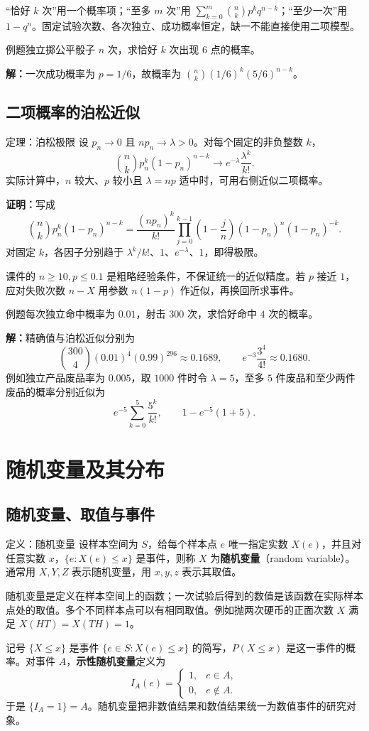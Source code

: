 \documentclass[UTF8,fontset=none,zihao=-4,a4paper]{ctexart}
\newcommand{\term}[1]{\textbf{#1}}
\newcommand{\example}[1]{\begin{infobox}{例题}#1\end{infobox}}
\newcommand{\solution}{\par\noindent\textbf{解：}}
\newcommand{\proof}{\par\noindent\textbf{证明：}}
\newcommand{\chapterpage}[1]{\clearpage\section{#1}}
\newcommand{\com}[2]{\binom{#1}{#2}}
\begin{document}
“恰好 $k$ 次”用一个概率项；“至多 $m$ 次”用 $\sum_{k=0}^m\com nk p^kq^{n-k}$；“至少一次”用 $1-q^n$。固定试验次数、各次独立、成功概率恒定，缺一不能直接使用二项模型。
\example{独立掷公平骰子 $n$ 次，求恰好 $k$ 次出现 $6$ 点的概率。}
\solution 一次成功概率为 $p=1/6$，故概率为 $\com nk(1/6)^k(5/6)^{n-k}$。
\subsection{二项概率的泊松近似}
\begin{infobox}{定理：泊松极限}
设 $p_n\to0$ 且 $np_n\to\lambda>0$。对每个固定的非负整数 $k$，
\[
\com nk p_n^k(1-p_n)^{n-k}\longrightarrow e^{-\lambda}\frac{\lambda^k}{k!}.
\]
实际计算中，$n$ 较大、$p$ 较小且 $\lambda=np$ 适中时，可用右侧近似二项概率。
\end{infobox}
\proof 写成
\[
\com nk p_n^k(1-p_n)^{n-k}
=\frac{(np_n)^k}{k!}\prod_{j=0}^{k-1}\left(1-\frac jn\right)
(1-p_n)^n(1-p_n)^{-k}.
\]
对固定 $k$，各因子分别趋于 $\lambda^k/k!$、$1$、$e^{-\lambda}$、$1$，即得极限。

课件的 $n\ge10,p\le0.1$ 是粗略经验条件，不保证统一的近似精度。若 $p$ 接近 $1$，应对失败次数 $n-X$ 用参数 $n(1-p)$ 作近似，再换回所求事件。
\example{每次独立命中概率为 $0.01$，射击 $300$ 次，求恰好命中 $4$ 次的概率。}
\solution 精确值与泊松近似分别为
\[
\com{300}4(0.01)^4(0.99)^{296}\approx0.1689,
\qquad e^{-3}\frac{3^4}{4!}\approx0.1680.
\]
例如独立产品废品率为 $0.005$，取 $1000$ 件时令 $\lambda=5$，至多 $5$ 件废品和至少两件废品的概率分别近似为
\[
e^{-5}\sum_{k=0}^5\frac{5^k}{k!},\qquad 1-e^{-5}(1+5).
\]

\chapterpage{随机变量及其分布}
\subsection{随机变量、取值与事件}
\begin{infobox}{定义：随机变量}
设样本空间为 $S$，给每个样本点 $e$ 唯一指定实数 $X(e)$，并且对任意实数 $x$，$\{e:X(e)\le x\}$ 是事件，则称 $X$ 为\term{随机变量}（random variable）。通常用 $X,Y,Z$ 表示随机变量，用 $x,y,z$ 表示其取值。
\end{infobox}
随机变量是定义在样本空间上的函数；一次试验后得到的数值是该函数在实际样本点处的取值。多个不同样本点可以有相同取值。例如抛两次硬币的正面次数 $X$ 满足 $X(HT)=X(TH)=1$。

记号 $\{X\le x\}$ 是事件 $\{e\in S:X(e)\le x\}$ 的简写，$P(X\le x)$ 是这一事件的概率。对事件 $A$，\term{示性随机变量}定义为
\[
I_A(e)=\begin{cases}1,&e\in A,\\0,&e\notin A.\end{cases}
\]
于是 $\{I_A=1\}=A$。随机变量把非数值结果和数值结果统一为数值事件的研究对象。
\end{document}
